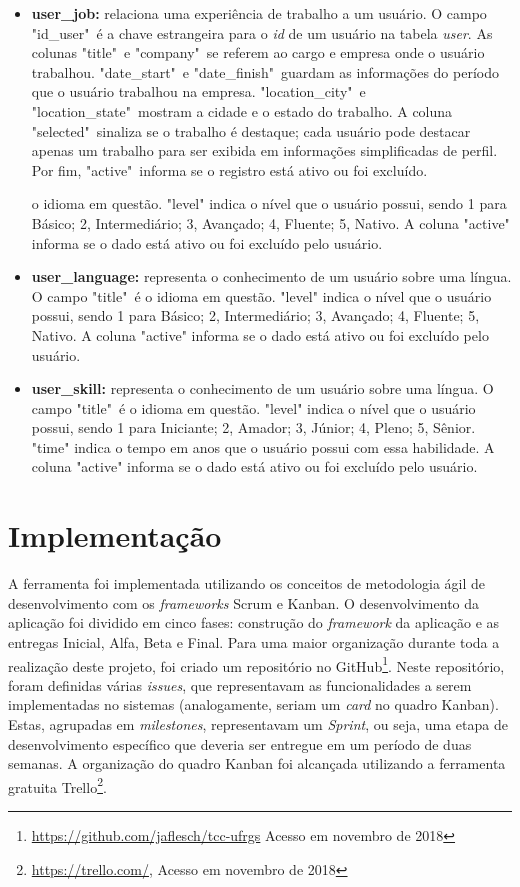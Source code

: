 \begin{itemize}
    \item \textbf{user\_job:} relaciona uma experiência de trabalho a um usuário. O campo "id\_user"\ é a chave estrangeira para o \textit{id} de um usuário na tabela \textit{user}. As colunas "title"\ e "company"\ se referem ao cargo e empresa onde o  usuário trabalhou. "date\_start"\ e "date\_finish"\ guardam as informações do período que o usuário trabalhou na empresa. "location\_city"\ e "location\_state"\ mostram a cidade e o estado do trabalho. A coluna "selected"\ sinaliza se o trabalho é destaque; cada usuário pode destacar apenas um trabalho para ser exibida em informações simplificadas de perfil. Por fim, "active"\ informa se o registro está ativo ou foi excluído.
    
    o idioma em questão. "level" indica o nível que o usuário possui, sendo 1 para Básico; 2, Intermediário; 3, Avançado; 4, Fluente; 5, Nativo. A coluna "active" informa se o dado está ativo ou foi excluído pelo usuário.
    
    \item \textbf{user\_language:} representa o conhecimento de um usuário sobre uma língua. O campo "title"\ é o idioma em questão. "level" indica o nível que o usuário possui, sendo 1 para Básico; 2, Intermediário; 3, Avançado; 4, Fluente; 5, Nativo. A coluna "active" informa se o dado está ativo ou foi excluído pelo usuário.
    
    \item \textbf{user\_skill:} representa o conhecimento de um usuário sobre uma língua. O campo "title"\ é o idioma em questão. "level" indica o nível que o usuário possui, sendo 1 para Iniciante; 2, Amador; 3, Júnior; 4, Pleno; 5, Sênior. "time" indica o tempo em anos que o usuário possui com essa habilidade. A coluna "active" informa se o dado está ativo ou foi excluído pelo usuário.
    
\end{itemize}

\section{Implementação}
\label{metodologiaImplementação}

A ferramenta foi implementada utilizando os conceitos de metodologia ágil de desenvolvimento com os \textit{frameworks} Scrum e Kanban. O desenvolvimento da aplicação foi dividido em cinco fases: construção do \textit{framework} da aplicação e  as entregas Inicial, Alfa, Beta e Final. Para uma maior organização durante toda a realização deste projeto, foi criado um repositório no GitHub\footnote{\url{https://github.com/jaflesch/tcc-ufrgs} Acesso em novembro de 2018}. Neste repositório, foram definidas várias \textit{issues}, que representavam as funcionalidades a serem implementadas no sistemas (analogamente, seriam um \textit{card} no quadro Kanban). Estas, agrupadas em \textit{milestones}, representavam um \textit{Sprint}, ou seja, uma etapa de desenvolvimento específico que deveria ser entregue em um período de duas semanas. A organização do quadro Kanban foi alcançada utilizando a ferramenta gratuita Trello\footnote{\url{https://trello.com/}, Acesso em novembro de 2018}.

